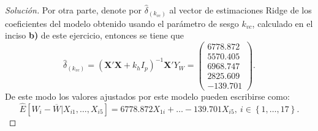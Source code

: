 \documentclass[10.5pt,notitlepage]{article}
\newenvironment{solucion}
  {\begin{proof}[Solución]}
  {\end{proof}}
\newcommand{\kis}[1]{\left\{ #1 \right\}}
\theoremstyle{plain}
\begin{document}
\begin{solucion}
Por otra parte, denote por \(\hat{\delta}_{(k_{vc})}\) al vector de estimaciones Ridge de los coeficientes del modelo obtenido usando el parámetro de sesgo \(k_{vc}\), calculado en el inciso \textbf{b)} de este ejercicio, entonces se tiene que
\begin{equation*}
    \hat{\delta}_{(k_{vc})} = (\mathbf{X}'\mathbf{X} + k_h I_{p})^{-1}\mathbf{X}'Y_{W} =  \begin{pmatrix}  6778.872\\
 5570.405\\
 6968.747\\
 2825.609\\
-139.701\end{pmatrix}.
\end{equation*}
De este modo los valores ajustados por este modelo pueden escribirse como:
\begin{equation}\label{Mod kvc}
      \widehat{E}[W_{i} - \overline{W}| X_{i1}, \hdots, X_{i5}] =  6778.872 X_{1i} + \hdots-139.701 X_{i5}, \ i \in \kis{1, \hdots, 17}.
\end{equation}


\end{solucion}
\end{document}
